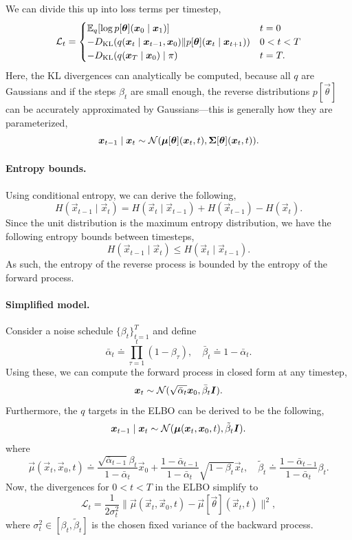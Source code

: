 We can divide this up into loss terms per timestep, \[
    \mathcal{L}_t = \begin{cases}
        \E_q \lft[ \log p[\vec{\theta}](\vec{x}_0 \mid \vec{x}_1) \rgt] & t = 0 \\
        -D_{\mathrm{KL}}(q(\vec{x}_t \mid \vec{x}_{t-1}, \vec{x}_0) \| p[\vec{\theta}](\vec{x}_t \mid \vec{x}_{t+1})) & 0 < t < T \\
        -D_{\mathrm{KL}}(q(\vec{x}_T \mid \vec{x}_0) \mid \pi) & t = T.
    \end{cases}
\]
Here, the KL divergences can analytically be computed, because all $q$ are Gaussians and if the steps
$\beta_t$ are small enough, the reverse distributions $p[\vec{\theta}]$ can be accurately approximated by
Gaussians---this is generally how they are parameterized, \[
    \bm{x}_{t-1} \mid \bm{x}_t \sim \mathcal{N}(\bm{\mu}[\bm{\theta}](\bm{x}_t, t), \bm{\Sigma}[\bm{\theta}](\bm{x}_t, t)).
\]

\paragraph{Entropy bounds.}

Using conditional entropy, we can derive the following, \[
    H(\vec{x}_{t-1} \mid \vec{x}_t) = H(\vec{x}_t \mid \vec{x}_{t-1}) + H(\vec{x}_{t-1}) - H(\vec{x}_t).
\]
Since the unit distribution is the maximum entropy distribution, we have the following entropy bounds between timesteps, \[
    H(\vec{x}_{t-1} \mid \vec{x}_t) \leq H(\vec{x}_t \mid \vec{x}_{t-1}).
\]
As such, the entropy of the reverse process is bounded by the entropy of the forward process.

\paragraph{Simplified model.}

Consider a noise schedule $\{ \beta_t \}_{t=1}^T$ and define \[
    \bar{\alpha}_t \doteq \prod_{\tau=1}^{t} (1-\beta_\tau), \quad \bar{\beta}_t \doteq 1 - \bar{\alpha}_t.
\]
Using these, we can compute the forward process in closed form at any timestep, \[
    \bm{x}_t \sim \mathcal{N}(\sqrt{\bar{\alpha}_t} \bm{x}_0, \bar{\beta}_t \bm{I}).
\]
Furthermore, the $q$ targets in the ELBO can be derived to be the following, \[
    \bm{x}_{t-1} \mid \bm{x}_t \sim \mathcal{N}(\bm{\mu}(\bm{x}_t, \bm{x}_0, t), \tilde{\beta}_t \bm{I}).
\]
where \[
    \vec{\mu}(\vec{x}_t, \vec{x}_0, t) \doteq \frac{\sqrt{\bar{\alpha}_{t-1}} \beta_t}{1- \bar{\alpha}_t} \vec{x}_0 + \frac{1-\bar{\alpha}_{t-1}}{1-\bar{\alpha}_t} \sqrt{1-\beta_t} \vec{x}_t, \quad \tilde{\beta}_t \doteq \frac{1-\bar{\alpha}_{t-1}}{1-\bar{\alpha}_t} \beta_t.
\]
Now, the divergences for $0 < t < T$ in the ELBO simplify to \[
    \mathcal{L}_t = \frac{1}{2 \sigma_t^2} \| \vec{\mu}(\vec{x}_t, \vec{x}_0, t) - \vec{\mu}[\vec{\theta}](\vec{x}_t, t) \|^2,
\]
where $\sigma_t^2 \in [\beta_t, \tilde{\beta}_t]$ is the chosen fixed variance of the backward process.

